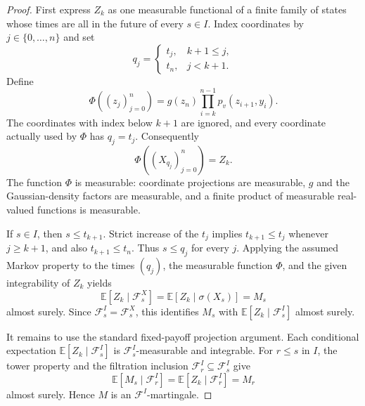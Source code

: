 \begin{proof}

\leanok
  First express $Z_k$ as one measurable functional of a finite family of
  states whose times are all in the future of every $s\in I$. Index
  coordinates by $j\in\{0,\ldots,n\}$ and set
  \[
    q_j=
    \begin{cases}
      t_j,& k+1\leq j,\\
      t_n,& j<k+1.
    \end{cases}
  \]
  Define
  \[
    \Phi((z_j)_{j=0}^n)
      =g(z_n)\prod_{i=k}^{n-1}p_v(z_{i+1},y_i).
  \]
  The coordinates with index below $k+1$ are ignored, and every coordinate
  actually used by $\Phi$ has $q_j=t_j$. Consequently
  \[
    \Phi((X_{q_j})_{j=0}^n)=Z_k.
  \]
  The function $\Phi$ is measurable: coordinate projections are
  measurable, $g$ and the Gaussian-density factors are measurable, and a
  finite product of measurable real-valued functions is measurable.

  If $s\in I$, then $s\leq t_{k+1}$. Strict increase of the $t_j$ implies
  $t_{k+1}\leq t_j$ whenever $j\geq k+1$, and also
  $t_{k+1}\leq t_n$. Thus $s\leq q_j$ for every $j$. Applying the assumed
  Markov property to the times $(q_j)$, the measurable function $\Phi$,
  and the given integrability of $Z_k$ yields
  \[
    \mathbb E[Z_k\mid\mathcal F^X_s]
      =\mathbb E[Z_k\mid\sigma(X_s)]=M_s
  \]
  almost surely. Since $\mathcal F^I_s=\mathcal F^X_s$, this identifies
  $M_s$ with $\mathbb E[Z_k\mid\mathcal F^I_s]$ almost surely.

  It remains to use the standard fixed-payoff projection argument. Each
  conditional expectation $\mathbb E[Z_k\mid\mathcal F^I_s]$ is
  $\mathcal F^I_s$-measurable and integrable. For $r\leq s$ in $I$, the
  tower property and the filtration inclusion
  $\mathcal F^I_r\subseteq\mathcal F^I_s$ give
  \[
    \mathbb E[M_s\mid\mathcal F^I_r]
      =\mathbb E[Z_k\mid\mathcal F^I_r]
      =M_r
  \]
  almost surely. Hence $M$ is an $\mathcal F^I$-martingale.
\end{proof}
